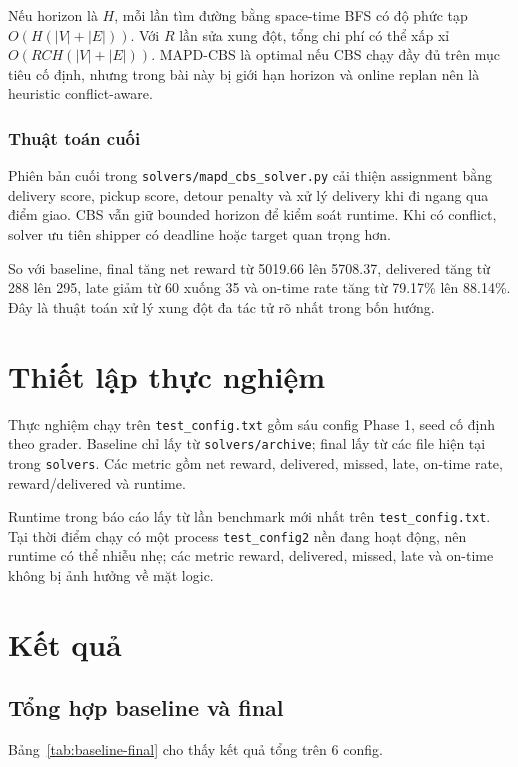 \documentclass[conference]{IEEEtran}
\newcommand{\code}[1]{\texttt{#1}}
\begin{document}
Nếu horizon là $H$, mỗi lần tìm đường bằng space-time BFS có độ phức tạp $O(H(|V|+|E|))$. Với $R$ lần sửa xung đột, tổng chi phí có thể xấp xỉ $O(RCH(|V|+|E|))$. MAPD-CBS là optimal nếu CBS chạy đầy đủ trên mục tiêu cố định, nhưng trong bài này bị giới hạn horizon và online replan nên là heuristic conflict-aware.

\subsubsection{Thuật toán cuối}
Phiên bản cuối trong \code{solvers/mapd\_cbs\_solver.py} cải thiện assignment bằng delivery score, pickup score, detour penalty và xử lý delivery khi đi ngang qua điểm giao. CBS vẫn giữ bounded horizon để kiểm soát runtime. Khi có conflict, solver ưu tiên shipper có deadline hoặc target quan trọng hơn.

So với baseline, final tăng net reward từ 5019.66 lên 5708.37, delivered tăng từ 288 lên 295, late giảm từ 60 xuống 35 và on-time rate tăng từ 79.17\% lên 88.14\%. Đây là thuật toán xử lý xung đột đa tác tử rõ nhất trong bốn hướng.

\section{Thiết lập thực nghiệm}
Thực nghiệm chạy trên \code{test\_config.txt} gồm sáu config Phase 1, seed cố định theo grader. Baseline chỉ lấy từ \code{solvers/archive}; final lấy từ các file hiện tại trong \code{solvers}. Các metric gồm net reward, delivered, missed, late, on-time rate, reward/delivered và runtime.

Runtime trong báo cáo lấy từ lần benchmark mới nhất trên \code{test\_config.txt}. Tại thời điểm chạy có một process \code{test\_config2} nền đang hoạt động, nên runtime có thể nhiễu nhẹ; các metric reward, delivered, missed, late và on-time không bị ảnh hưởng về mặt logic.

\section{Kết quả}
\subsection{Tổng hợp baseline và final}
Bảng~\ref{tab:baseline-final} cho thấy kết quả tổng trên 6 config.
\end{document}
